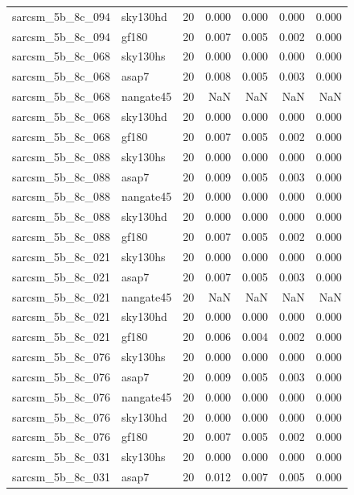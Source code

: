 \begin{tabular}{llrrrrr}
sarcsm\_5b\_8c\_094 & sky130hd & 20 & 0.000 & 0.000 & 0.000 & 0.000 \\
sarcsm\_5b\_8c\_094 & gf180 & 20 & 0.007 & 0.005 & 0.002 & 0.000 \\
sarcsm\_5b\_8c\_068 & sky130hs & 20 & 0.000 & 0.000 & 0.000 & 0.000 \\
sarcsm\_5b\_8c\_068 & asap7 & 20 & 0.008 & 0.005 & 0.003 & 0.000 \\
sarcsm\_5b\_8c\_068 & nangate45 & 20 & NaN & NaN & NaN & NaN \\
sarcsm\_5b\_8c\_068 & sky130hd & 20 & 0.000 & 0.000 & 0.000 & 0.000 \\
sarcsm\_5b\_8c\_068 & gf180 & 20 & 0.007 & 0.005 & 0.002 & 0.000 \\
sarcsm\_5b\_8c\_088 & sky130hs & 20 & 0.000 & 0.000 & 0.000 & 0.000 \\
sarcsm\_5b\_8c\_088 & asap7 & 20 & 0.009 & 0.005 & 0.003 & 0.000 \\
sarcsm\_5b\_8c\_088 & nangate45 & 20 & 0.000 & 0.000 & 0.000 & 0.000 \\
sarcsm\_5b\_8c\_088 & sky130hd & 20 & 0.000 & 0.000 & 0.000 & 0.000 \\
sarcsm\_5b\_8c\_088 & gf180 & 20 & 0.007 & 0.005 & 0.002 & 0.000 \\
sarcsm\_5b\_8c\_021 & sky130hs & 20 & 0.000 & 0.000 & 0.000 & 0.000 \\
sarcsm\_5b\_8c\_021 & asap7 & 20 & 0.007 & 0.005 & 0.003 & 0.000 \\
sarcsm\_5b\_8c\_021 & nangate45 & 20 & NaN & NaN & NaN & NaN \\
sarcsm\_5b\_8c\_021 & sky130hd & 20 & 0.000 & 0.000 & 0.000 & 0.000 \\
sarcsm\_5b\_8c\_021 & gf180 & 20 & 0.006 & 0.004 & 0.002 & 0.000 \\
sarcsm\_5b\_8c\_076 & sky130hs & 20 & 0.000 & 0.000 & 0.000 & 0.000 \\
sarcsm\_5b\_8c\_076 & asap7 & 20 & 0.009 & 0.005 & 0.003 & 0.000 \\
sarcsm\_5b\_8c\_076 & nangate45 & 20 & 0.000 & 0.000 & 0.000 & 0.000 \\
sarcsm\_5b\_8c\_076 & sky130hd & 20 & 0.000 & 0.000 & 0.000 & 0.000 \\
sarcsm\_5b\_8c\_076 & gf180 & 20 & 0.007 & 0.005 & 0.002 & 0.000 \\
sarcsm\_5b\_8c\_031 & sky130hs & 20 & 0.000 & 0.000 & 0.000 & 0.000 \\
sarcsm\_5b\_8c\_031 & asap7 & 20 & 0.012 & 0.007 & 0.005 & 0.000 \\

\end{tabular}
